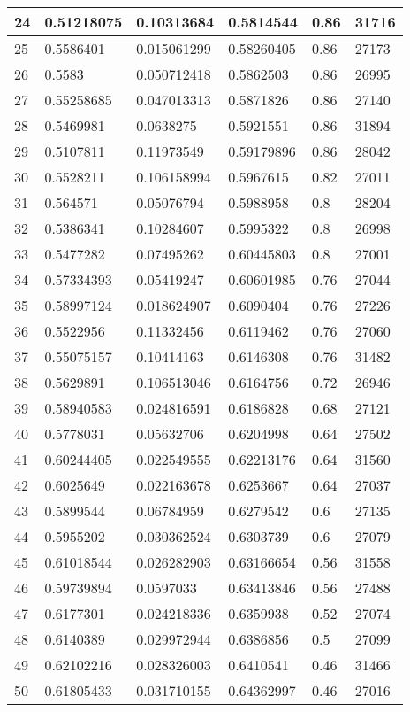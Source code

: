 \begin{longtable}{|l|l|l|l|l|l|}
24 & 0.51218075 & 0.10313684 & 0.5814544 & 0.86 & 31716 \\ \hline 
25 & 0.5586401 & 0.015061299 & 0.58260405 & 0.86 & 27173 \\ \hline 
26 & 0.5583 & 0.050712418 & 0.5862503 & 0.86 & 26995 \\ \hline 
27 & 0.55258685 & 0.047013313 & 0.5871826 & 0.86 & 27140 \\ \hline 
28 & 0.5469981 & 0.0638275 & 0.5921551 & 0.86 & 31894 \\ \hline 
29 & 0.5107811 & 0.11973549 & 0.59179896 & 0.86 & 28042 \\ \hline 
30 & 0.5528211 & 0.106158994 & 0.5967615 & 0.82 & 27011 \\ \hline 
31 & 0.564571 & 0.05076794 & 0.5988958 & 0.8 & 28204 \\ \hline 
32 & 0.5386341 & 0.10284607 & 0.5995322 & 0.8 & 26998 \\ \hline 
33 & 0.5477282 & 0.07495262 & 0.60445803 & 0.8 & 27001 \\ \hline 
34 & 0.57334393 & 0.05419247 & 0.60601985 & 0.76 & 27044 \\ \hline 
35 & 0.58997124 & 0.018624907 & 0.6090404 & 0.76 & 27226 \\ \hline 
36 & 0.5522956 & 0.11332456 & 0.6119462 & 0.76 & 27060 \\ \hline 
37 & 0.55075157 & 0.10414163 & 0.6146308 & 0.76 & 31482 \\ \hline 
38 & 0.5629891 & 0.106513046 & 0.6164756 & 0.72 & 26946 \\ \hline 
39 & 0.58940583 & 0.024816591 & 0.6186828 & 0.68 & 27121 \\ \hline 
40 & 0.5778031 & 0.05632706 & 0.6204998 & 0.64 & 27502 \\ \hline 
41 & 0.60244405 & 0.022549555 & 0.62213176 & 0.64 & 31560 \\ \hline 
42 & 0.6025649 & 0.022163678 & 0.6253667 & 0.64 & 27037 \\ \hline 
43 & 0.5899544 & 0.06784959 & 0.6279542 & 0.6 & 27135 \\ \hline 
44 & 0.5955202 & 0.030362524 & 0.6303739 & 0.6 & 27079 \\ \hline 
45 & 0.61018544 & 0.026282903 & 0.63166654 & 0.56 & 31558 \\ \hline 
46 & 0.59739894 & 0.0597033 & 0.63413846 & 0.56 & 27488 \\ \hline 
47 & 0.6177301 & 0.024218336 & 0.6359938 & 0.52 & 27074 \\ \hline 
48 & 0.6140389 & 0.029972944 & 0.6386856 & 0.5 & 27099 \\ \hline 
49 & 0.62102216 & 0.028326003 & 0.6410541 & 0.46 & 31466 \\ \hline 
50 & 0.61805433 & 0.031710155 & 0.64362997 & 0.46 & 27016 \\ \hline 
\end{longtable}